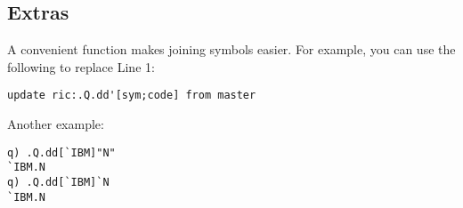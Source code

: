\subsection{Extras}
\begin{tipblock}
A convenient function \href{https://code.kx.com/q/ref/dotq/#qdd-join-symbols}{} makes joining symbols easier. For example, you can use the following to replace Line 1:
\begin{verbatim}
update ric:.Q.dd'[sym;code] from master
\end{verbatim}

Another example:
\begin{verbatim}
q) .Q.dd[`IBM]"N"
`IBM.N
q) .Q.dd[`IBM]`N
`IBM.N
\end{verbatim}
\end{tipblock}

\clearpage
